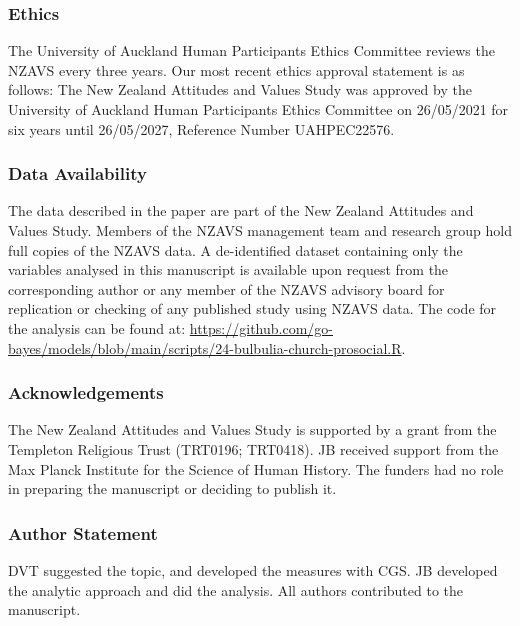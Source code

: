 \documentclass[
  single column]{article}
\begin{document}
\newpage{}

\subsubsection{Ethics}\label{ethics}

The University of Auckland Human Participants Ethics Committee reviews
the NZAVS every three years. Our most recent ethics approval statement
is as follows: The New Zealand Attitudes and Values Study was approved
by the University of Auckland Human Participants Ethics Committee on
26/05/2021 for six years until 26/05/2027, Reference Number UAHPEC22576.

\subsubsection{Data Availability}\label{data-availability}

The data described in the paper are part of the New Zealand Attitudes
and Values Study. Members of the NZAVS management team and research
group hold full copies of the NZAVS data. A de-identified dataset
containing only the variables analysed in this manuscript is available
upon request from the corresponding author or any member of the NZAVS
advisory board for replication or checking of any published study using
NZAVS data. The code for the analysis can be found at:
\url{https://github.com/go-bayes/models/blob/main/scripts/24-bulbulia-church-prosocial.R}.

\subsubsection{Acknowledgements}\label{acknowledgements}

The New Zealand Attitudes and Values Study is supported by a grant from
the Templeton Religious Trust (TRT0196; TRT0418). JB received support
from the Max Planck Institute for the Science of Human History. The
funders had no role in preparing the manuscript or deciding to publish
it.

\subsubsection{Author Statement}\label{author-statement}

DVT suggested the topic, and developed the measures with CGS. JB
developed the analytic approach and did the analysis. All authors
contributed to the manuscript.

\newpage{}
\end{document}

